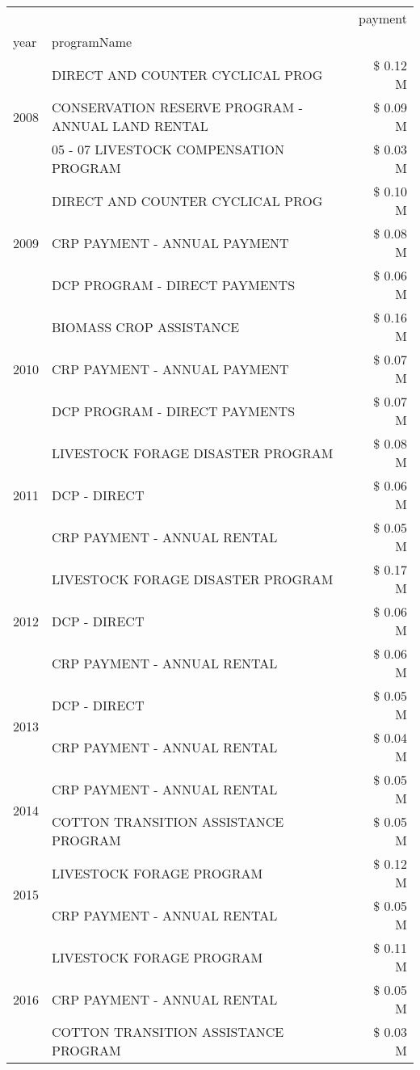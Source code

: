 \begin{tabular}{llr}
\toprule
 &  & payment \\
year & programName &  \\
\midrule
\multirow[t]{3}{*}{2008} & DIRECT AND COUNTER CYCLICAL PROG & \$ 0.12 M \\
 & CONSERVATION RESERVE PROGRAM - ANNUAL LAND RENTAL & \$ 0.09 M \\
 & 05 - 07 LIVESTOCK COMPENSATION PROGRAM & \$ 0.03 M \\
\cline{1-3}
\multirow[t]{3}{*}{2009} & DIRECT AND COUNTER CYCLICAL PROG & \$ 0.10 M \\
 & CRP PAYMENT - ANNUAL PAYMENT & \$ 0.08 M \\
 & DCP PROGRAM - DIRECT PAYMENTS & \$ 0.06 M \\
\cline{1-3}
\multirow[t]{3}{*}{2010} & BIOMASS CROP ASSISTANCE & \$ 0.16 M \\
 & CRP PAYMENT - ANNUAL PAYMENT & \$ 0.07 M \\
 & DCP PROGRAM - DIRECT PAYMENTS & \$ 0.07 M \\
\cline{1-3}
\multirow[t]{3}{*}{2011} & LIVESTOCK FORAGE DISASTER PROGRAM & \$ 0.08 M \\
 & DCP - DIRECT & \$ 0.06 M \\
 & CRP PAYMENT - ANNUAL RENTAL & \$ 0.05 M \\
\cline{1-3}
\multirow[t]{3}{*}{2012} & LIVESTOCK FORAGE DISASTER PROGRAM & \$ 0.17 M \\
 & DCP - DIRECT & \$ 0.06 M \\
 & CRP PAYMENT - ANNUAL RENTAL & \$ 0.06 M \\
\cline{1-3}
\multirow[t]{2}{*}{2013} & DCP - DIRECT & \$ 0.05 M \\
 & CRP PAYMENT - ANNUAL RENTAL & \$ 0.04 M \\
\cline{1-3}
\multirow[t]{2}{*}{2014} & CRP PAYMENT - ANNUAL RENTAL & \$ 0.05 M \\
 & COTTON TRANSITION ASSISTANCE PROGRAM & \$ 0.05 M \\
\cline{1-3}
\multirow[t]{2}{*}{2015} & LIVESTOCK FORAGE PROGRAM & \$ 0.12 M \\
 & CRP PAYMENT - ANNUAL RENTAL & \$ 0.05 M \\
\cline{1-3}
\multirow[t]{3}{*}{2016} & LIVESTOCK FORAGE PROGRAM & \$ 0.11 M \\
 & CRP PAYMENT - ANNUAL RENTAL & \$ 0.05 M \\
 & COTTON TRANSITION ASSISTANCE PROGRAM & \$ 0.03 M \\

\end{tabular}

